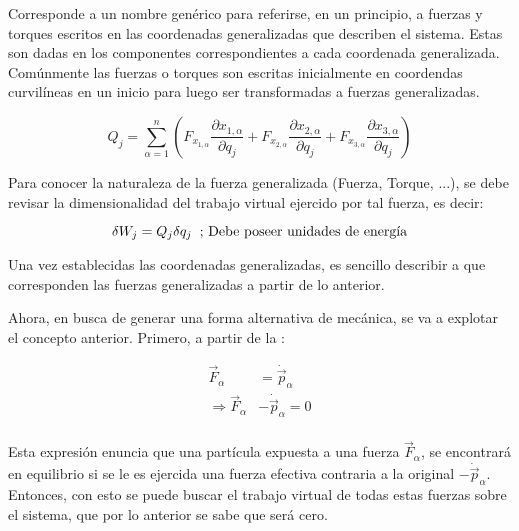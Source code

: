\documentclass[/home/hernan-barquero/Documents/Apuntes_mecanica_teorica/main.tex]{subfiles}
\begin{document}
    \begin{definition} 
        Corresponde a un nombre genérico para referirse, en un principio, a fuerzas y torques escritos en las coordenadas generalizadas que describen el sistema. Estas son dadas en los componentes correspondientes a cada coordenada generalizada. Comúnmente las fuerzas o torques son escritas inicialmente en coordendas curvilíneas en un inicio para luego ser transformadas a fuerzas generalizadas.

        \begin{equation}
            Q_{j} = \sum_{\alpha=1}^{n} \left( F_{x_{1,\alpha}} \frac{\partial x_{1,\alpha}}{\partial q_{j}} +   F_{x_{2,\alpha}} \frac{\partial x_{2,\alpha}}{\partial q_{j}} + F_{x_{3,\alpha}} \frac{\partial x_{3,\alpha}}{\partial q_{j}} \right)
            \label{eq: fuerzasgeneralizadas}
        \end{equation}

        Para conocer la naturaleza de la fuerza generalizada (Fuerza, Torque, ...), se debe revisar la dimensionalidad del trabajo virtual ejercido por tal fuerza, es decir:

        \begin{equation*}
            \delta W_{j} = Q_{j} \delta q_{j} \; \; \textup{; Debe poseer unidades de energía}
        \end{equation*}

        Una vez establecidas las coordenadas generalizadas, es sencillo describir a que corresponden las fuerzas generalizadas a partir de lo anterior.
        
    \end{definition}
    
    Ahora, en busca de generar una forma alternativa de mecánica, se va a explotar el concepto anterior. Primero, a partir de la :

    \begin{align*}
        \vec{F}_{\alpha} &= \dot{\vec{p}}_{\alpha} \\ 
        \Rightarrow \vec{F}_{\alpha} &- \dot{\vec{p}}_{\alpha} = 0 \\ 
    \end{align*}

    Esta expresión enuncia que una partícula expuesta a una fuerza $ \vec{F}_{\alpha}$, se encontrará en equilibrio si se le es ejercida una fuerza efectiva contraria a la original $- \dot{\vec{p}}_{\alpha}$. Entonces, con esto se puede buscar el trabajo virtual de todas estas fuerzas sobre el sistema, que por lo anterior se sabe que será cero.
\end{document}
